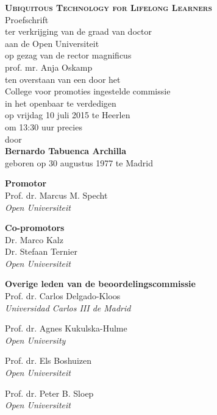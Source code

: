 \documentclass[normalheadings,tablecaptionabove,twoside,openright,chapterprefix,halfparskip,fontsize=10pt,numbers=noenddot]{scrbook} %
\begin{document}
\begin{titlepage}
	\newpage
	\null\vspace*{15.25em}
	\center
	\huge
	\textbf{\textsc{Ubiquitous Technology for Lifelong Learners}}\\
	\vspace{2em}
	\normalsize
	Proefschrift\\
	\vspace{1em}
	ter verkrijging  van de graad van doctor \\
	aan de Open Universiteit \\
	op gezag van de rector magnificus \\
	prof. mr. Anja Oskamp \\
	ten overstaan van een door het \\
	College voor promoties ingestelde commissie \\
	in het openbaar te verdedigen\\
	\vspace{1em}
	op vrijdag 10 juli 2015 te Heerlen \\
	om 13:30 uur precies\\
	\vspace{1em}
	door\\
	\vspace{1em}
	\textbf{Bernardo Tabuenca Archilla}\\
	geboren op 30 augustus 1977 te Madrid\\
	\vfill\null
	
	\newpage
	\null\vfill
	\raggedright
	\textbf{Promotor} \\
	Prof. dr. Marcus M. Specht \\
	\textit{Open Universiteit} \par
	\textbf{Co-promotors} \\
	Dr. Marco Kalz \\
	Dr. Stefaan Ternier \\	
	\textit{Open Universiteit} \par
	\textbf{Overige leden van de beoordelingscommissie}\\
	Prof. dr. Carlos Delgado-Kloos \\
	\textit{Universidad Carlos III de Madrid} \par
	Prof. dr. Agnes Kukulska-Hulme \\
	\textit{Open University}  \par
	Prof. dr. Els Boshuizen \\
	\textit{Open Universiteit} \par
	Prof. dr. Peter B. Sloep \\
	\textit{Open Universiteit}

	\newpage
	\null\vspace*{15.25em}
	\begin{quote}
	\end{quote}
	\vfill\null
	\clearpage{\pagestyle{empty}\cleardoublepage}
\end{titlepage}
	
\end{document}
